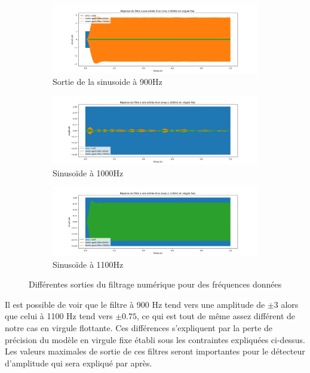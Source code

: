 \begin{figure}[H]
    \centering
    \begin{subfigure}[b]{0.7\textwidth}
        \centering
        \includegraphics[width=\textwidth]{Pictures/virgule_fixe_900.png}
        \caption{Sortie de la sinusoide à 900Hz}
        \label{fig:image1}
    \end{subfigure}
    \begin{subfigure}[b]{0.7\textwidth}
        \centering
        \includegraphics[width=\textwidth]{Pictures/virgule_fixe1000.png}
        \caption{Sinusoïde à 1000Hz}
        \label{fig:image2}
    \end{subfigure}   
    \begin{subfigure}[b]{0.7\textwidth}
        \centering
        \includegraphics[width=\textwidth]{Pictures/test_virgule_fixe_1100.png}
        \caption{Sinusoïde à 1100Hz}
        \label{fig:image3}
    \end{subfigure}
    \caption{Différentes sorties du filtrage numérique pour des fréquences données}
    \label{fig:subplots}
\end{figure}
Il est possible de voir que le filtre à 900 Hz tend vers une amplitude de $\pm3$ alors que celui à 1100 Hz tend vers $\pm 0.75$, ce qui est tout de même assez différent de notre cas en virgule flottante. Ces différences s'expliquent par la perte de précision du modèle en virgule fixe établi sous les contraintes expliquées ci-dessus. Les valeurs maximales de sortie de ces filtres seront importantes pour le détecteur d'amplitude qui sera expliqué par après.
